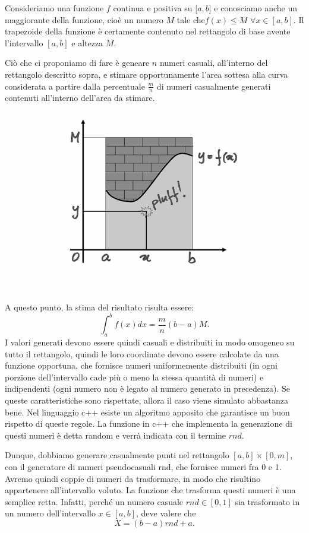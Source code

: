 \documentclass{article}
\begin{document}
Consideriamo una funzione $f$ continua e positiva su $[a,b$] e conosciamo anche un maggiorante della funzione, cioè un numero $M$ tale che$ f(x)\le M$ $\forall x\in [a,b]$. Il trapezoide della funzione è certamente contenuto nel rettangolo di base avente l’intervallo $[a,b]$ e altezza $M$.

Ciò che ci proponiamo di fare è geneare $n$ numeri casuali, all'interno del rettangolo descritto sopra, e stimare opportunamente l'area sottesa alla curva considerata a partire dalla percentuale $\frac{m}{n}$ di numeri casualmente generati contenuti all'interno dell'area da stimare.

\begin{figure}[ht]
\centering
\includegraphics[scale=0.25]{img/09_06_pluff.png} 
\label{fig:Montecarlo}
\end{figure}\

A questo punto, la stima del risultato risulta essere: 
\[
\int_a^bf(x)dx=\frac{m}{n}(b-a)M.
\]
I valori generati devono essere quindi casuali e distribuiti in modo omogeneo su tutto il rettangolo, quindi le loro coordinate devono essere calcolate da una funzione opportuna, che fornisce numeri uniformemente distribuiti (in ogni porzione dell’intervallo cade più o meno la stessa quantità di numeri) e indipendenti (ogni numero non è legato al numero generato in precedenza). Se queste caratteristiche sono rispettate, allora il caso viene simulato abbastanza bene. Nel linguaggio c++ esiste un algoritmo apposito che garantisce un buon rispetto di queste regole. La funzione in c++ che implementa la generazione di questi numeri è detta random e verrà indicata con il termine $\mathit{rnd}$.

Dunque, dobbiamo generare casualmente punti nel rettangolo $[a,b]\times[0,m]$, con il generatore di numeri pseudocasuali rnd, che fornisce numeri fra 0 e 1. Avremo quindi coppie di numeri da trasformare, in modo che risultino appartenere all’intervallo voluto. La funzione che trasforma questi numeri è una semplice retta. Infatti, perché un numero casuale $\mathit{rnd} \in [0,1]$ sia trasformato in un numero dell’intervallo  $x\in[a,b]$, deve valere che
\[
X=(b-a)\mathit{rnd}+a.\]
\end{document}
